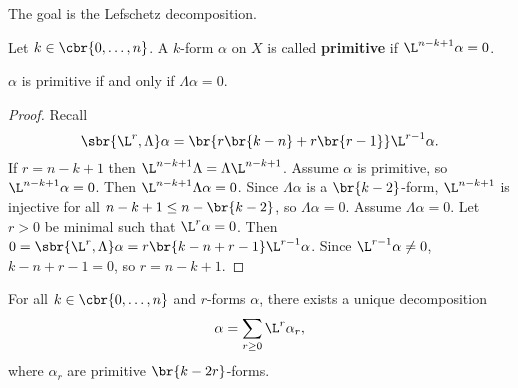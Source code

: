 The goal is the Lefschetz decomposition.

\begin{definition}
Let $ k \in \cbr{0, \dots, n} $. A $ k $-form $ \alpha $ on $ X $ is called \textbf{primitive} if $ \L^{n - k + 1}\alpha = 0 $.
\end{definition}

\begin{lemma}
\label{lem:6.45}
$ \alpha $ is primitive if and only if $ \Lambda\alpha = 0 $.
\end{lemma}

\begin{proof}
Recall
$$ \sbr{\L^r, \Lambda}\alpha = \br{r\br{k - n} + r\br{r - 1}}\L^{r - 1}\alpha. $$
If $ r = n - k + 1 $ then $ \L^{n - k + 1}\Lambda = \Lambda\L^{n - k + 1} $. Assume $ \alpha $ is primitive, so $ \L^{n - k + 1}\alpha = 0 $. Then $ \L^{n - k + 1}\Lambda\alpha = 0 $. Since $ \Lambda\alpha $ is a $ \br{k - 2} $-form, $ \L^{n - k + 1} $ is injective for all $ n - k + 1 \le n - \br{k - 2} $, so $ \Lambda\alpha = 0 $. Assume $ \Lambda\alpha = 0 $. Let $ r > 0 $ be minimal such that $ \L^r\alpha = 0 $. Then $ 0 = \sbr{\L^r, \Lambda}\alpha = r\br{k - n + r - 1}\L^{r - 1}\alpha $. Since $ \L^{r - 1}\alpha \ne 0 $, $ k - n + r - 1 = 0 $, so $ r = n - k + 1 $.
\end{proof}

\pagebreak

\begin{proposition}
For all $ k \in \cbr{0, \dots, n} $ and $ r $-forms $ \alpha $, there exists a unique decomposition
$$ \alpha = \sum_{r \ge 0} \L^r\alpha_r, $$
where $ \alpha_r $ are primitive $ \br{k - 2r} $-forms.
\end{proposition}

